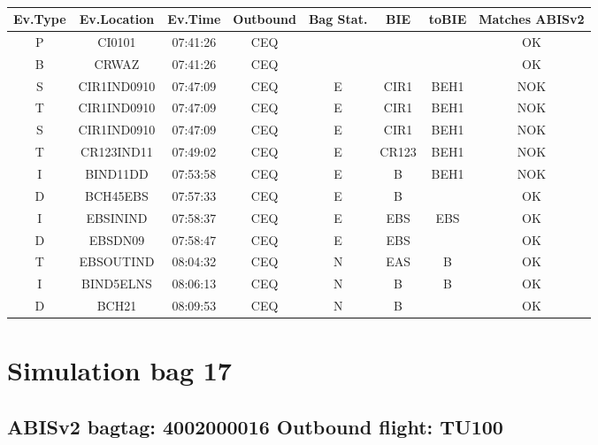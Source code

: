\documentclass{report}
\begin{document}
\paragraph{}
\begin{longtable}{cccccccc}    \toprule
\rowcolor{white!50}
\textbf{Ev.Type} & \textbf{Ev.Location} & \textbf{Ev.Time} & \textbf{Outbound} & \textbf{Bag Stat.} & \textbf{BIE} & \textbf{toBIE} & \textbf{Matches ABISv2} \\\midrule
P & CI0101 & 07:41:26  & CEQ &  &  &  & OK\\
B & CRWAZ & 07:41:26  & CEQ &  &  &  & OK\\
S & CIR1IND0910 & 07:47:09  & CEQ & E & CIR1 & BEH1 & NOK\\
T & CIR1IND0910 & 07:47:09  & CEQ & E & CIR1 & BEH1 & NOK\\
S & CIR1IND0910 & 07:47:09  & CEQ & E & CIR1 & BEH1 & NOK\\
T & CR123IND11 & 07:49:02  & CEQ & E & CR123 & BEH1 & NOK\\
I & BIND11DD & 07:53:58  & CEQ & E & B & BEH1 & NOK\\
D & BCH45EBS & 07:57:33  & CEQ & E & B &  & OK\\
I & EBSININD & 07:58:37  & CEQ & E & EBS & EBS & OK\\
D & EBSDN09 & 07:58:47  & CEQ & E & EBS &  & OK\\
T & EBSOUTIND & 08:04:32  & CEQ & N & EAS & B & OK\\
I & BIND5ELNS & 08:06:13  & CEQ & N & B & B & OK\\
D & BCH21 & 08:09:53  & CEQ & N & B &  & OK\\
\bottomrule
\end{longtable}
\pagebreak
\section*{Simulation bag 17}
\subsection*{ABISv2 bagtag: 4002000016 Outbound flight: TU100}
\end{document}
